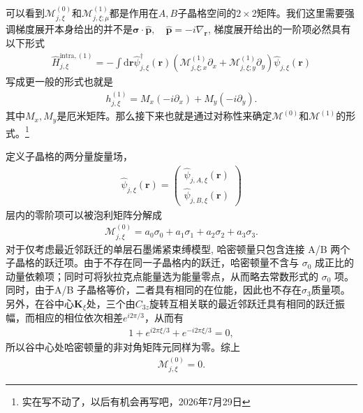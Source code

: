 \documentclass[10pt, oneside]{article}
\begin{document}
可以看到\(\mathcal{M }^{\left(0\right)}_{j,\xi}\)和\(\mathcal{M }^{\left(1\right)}_{j,\xi;\mu}\)都是作用在\(A,B\)子晶格空间的\(2 \times 2\)矩阵。我们这里需要强调梯度展开本身给出的并不是\(\bm{\sigma} \cdot \hat{\bm{p}},\quad \hat{\bm{p}} = - i \nabla_{\bm{r}}\), 梯度展开给出的一阶项必然具有以下形式
\begin{align}
	\hat{H}^{\mathrm{intra}, \left(1\right)}_{j,\xi} = -\int \mathrm{d} \bm{r} \hat{\psi}^{\dagger}_{j, \xi} \left(\bm{r}\right) \left(\mathcal{M }^{\left(1\right)}_{j,\xi;x} \partial_{x } + \mathcal{M }^{\left(1\right)}_{j,\xi;y} \partial_{y}\right) \hat{\psi}_{j,\xi} \left(\bm{r}\right)
\end{align}
写成更一般的形式也就是
\begin{align}
	h^{\left(1\right)}_{j,\xi} = M_x \left(- i \partial_{x } \right) + M_{y} \left(-i \partial_{y}\right).
\end{align}
其中\(M_{x }, M_{y}\)是厄米矩阵。那么接下来也就是通过对称性来确定\(\mathcal{M}^{\left(0\right)}\)和\(\mathcal{M }^{\left(1\right)}\)的形式。\footnote{实在写不动了，以后有机会再写吧，2026年7月29日}

定义子晶格的两分量旋量场，
\begin{align}
	\hat{\psi}_{j,\xi} \left(\bm{r}\right) = \begin{pmatrix}
		\hat{\psi}_{j,A,\xi} \left(\bm{r}\right) \\ \hat{\psi}_{j,B,\xi} \left(\bm{r}\right)
	\end{pmatrix}
\end{align}
层内的零阶项可以被泡利矩阵分解成
\begin{align}
	\mathcal{M }^{\left(0\right)}_{j,\xi} = a_0 \sigma_{0} + a_{1} \sigma_{1} + a_2 \sigma_{2} + a_3 \sigma_{3}.
\end{align}
对于仅考虑最近邻跃迁的单层石墨烯紧束缚模型, 哈密顿量只包含连接 A/B 两个子晶格的跃迁项。由于不存在同一子晶格内的跃迁，哈密顿量不含与 \(\sigma_{0}\) 成正比的动量依赖项；同时可将狄拉克点能量选为能量零点，从而略去常数形式的 \(\sigma_{0}\) 项。同时，由于A/B 子晶格等价，二者具有相同的在位能，因此也不存在\(\sigma_{3}\)质量项。另外，在谷中心\(\bm{K }_{\xi}\)处，三个由\(C_{3z}\)旋转互相关联的最近邻跃迁具有相同的跃迁振幅，而相应的相位依次相差\(e^{i 2 \pi/3}\)，从而有
\begin{align}
	1 + e^{i 2 \pi \xi/3} + e^{ - i 2 \pi \xi/3} = 0,
\end{align}
所以谷中心处哈密顿量的非对角矩阵元同样为零。综上
\begin{align}
	\mathcal{M }^{\left(0\right)}_{j,\xi} = 0.
\end{align}
\end{document}
